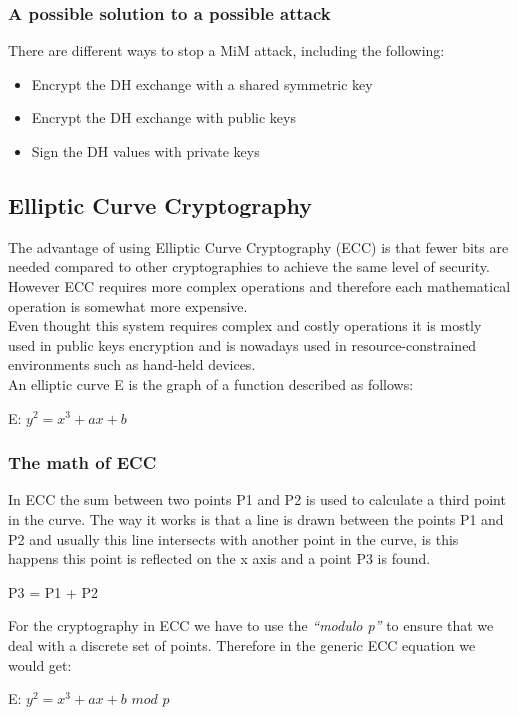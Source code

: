\documentclass[a4paper]{article}
\begin{document}
\subsubsection{A possible solution to a possible attack}
There are different ways to stop a MiM attack, including the following:
\begin{itemize}
    \item Encrypt the DH exchange with a shared symmetric key
    \item Encrypt the DH exchange with public keys
    \item Sign the DH values with private keys
\end{itemize}

\subsection{Elliptic Curve Cryptography}
The advantage of using Elliptic Curve Cryptography (ECC) is that fewer bits are needed compared to other cryptographies to achieve the same level of security. However ECC requires more complex operations and therefore each mathematical operation is somewhat more expensive.\\
Even thought this system requires complex and costly operations it is mostly used in public keys encryption and is nowadays used in resource-constrained environments such as hand-held devices.\\
An elliptic curve E is the graph of a function described as follows:
\begin{center}
    E: $y^2 = x^3 + ax + b$
\end{center}{}

\subsubsection{The math of ECC}
In ECC the sum between two points P1 and P2 is used to calculate a third point in the curve. The way it works is that a line is drawn between the points P1 and P2 and usually this line intersects with another point in the curve, is this happens this point is reflected on the x axis and a point P3 is found.
\begin{center}
    P3 = P1 + P2
\end{center}{}
For the cryptography in ECC we have to use the \textit{``modulo p''} to ensure that we deal with a discrete set of points. Therefore in the generic ECC equation we would get:
\begin{center}
    E: $y^2 = x^3 + ax + b$ $mod$ $p$
\end{center}{}
\end{document}
